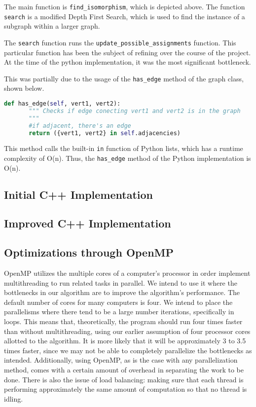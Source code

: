 \documentclass{article}
\begin{document}
  The main function is \texttt{find\_isomorphism}, which is depicted above. The function \texttt{search} is a modified Depth First Search, which is used to find the instance of a subgraph within a larger graph.


  The \texttt{search} function runs  the \texttt{update\_possible\_assignments} function. This particular function has been the subject of refining over the course of the project. At the time of the python implementation, it was the most significant bottleneck.


  This was partially due to the usage of the \texttt{has\_edge} method of the graph class, shown below.


  \begin{lstlisting}[language=Python,caption={Code for the \texttt{has\_edge} method of our graph class.}]
  def has_edge(self, vert1, vert2):
       """ Checks if edge conecting vert1 and vert2 is in the graph
       """
       #if adjacent, there's an edge
       return ({vert1, vert2} in self.adjacencies) 

  \end{lstlisting}

  This method calls the built-in \texttt{in} function of Python lists, which has a runtime complexity of O(n).\cite{bigopy} Thus, the \texttt{has\_edge} method of the Python implementation is O(n).

  \subsection{Initial C++ Implementation}

  \subsection{Improved C++ Implementation}

  \subsection{Optimizations through OpenMP}
  OpenMP utilizes the multiple cores of a computer's processor in order implement multithreading to run related tasks in parallel. We intend to use it where the bottlenecks in our algorithm are to improve the algorithm's performance. The default number of cores for many computers is four. We intend to place the parallelisms where there tend to be a large number iterations, specifically in loops. This means that, theoretically, the program should run four times faster than without multithreading, using our earlier assumption of four processor cores allotted to the algorithm. It is more likely that it will be approximately 3 to 3.5 times faster, since we may not be able to completely parallelize the bottlenecks as intended. Additionally, using OpenMP, as is the case with any parallelization method, comes with a certain amount of overhead in separating the work to be done. There is also the issue of load balancing: making sure that each thread is performing approximately the same amount of computation so that no thread is idling. 
  
\end{document}
